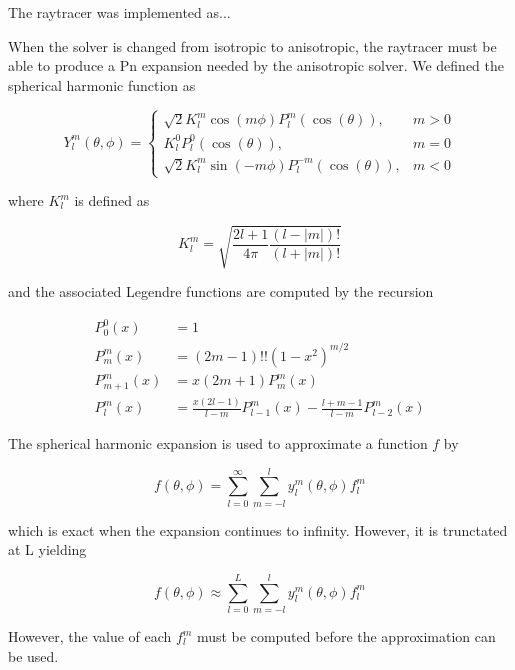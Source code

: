 \documentclass{article}
\numberwithin{equation}{subsection}
\begin{document}
The raytracer was implemented as...

When the solver is changed from isotropic to anisotropic, the raytracer must be able to produce a Pn expansion needed by the anisotropic solver. We defined the spherical harmonic function as

\begin{equation}
    Y_l^m(\theta, \phi)= 
\begin{cases}
\sqrt{2} K_l^m \cos(m \phi) P_l^m(\cos(\theta)),      & m > 0 \\
K_l^0 P_l^0(\cos(\theta)),              & m = 0  \\
\sqrt{2} K_l^m \sin(-m \phi) P_l^{-m}(\cos(\theta)),           & m < 0
\end{cases}
\end{equation}

where $K_l^m$ is defined as

\begin{equation}
K_l^m = \sqrt{\frac{2l+1}{4 \pi} \frac{(l-|m|)!}{(l+|m|)!}}
\end{equation}

and the associated Legendre functions are computed by the recursion

\begin{equation}
\begin{aligned}
P_0^0(x) &= 1 \\
P_m^m(x) &= (2m-1)!!(1-x^2)^{m/2} \\
P_{m+1}^m(x) &= x(2m+1)P_m^m(x) \\
P_l^m(x) &= \frac{x(2l-1)}{l-m} P_{l-1}^m (x) - \frac{l+m-1}{l-m} P_{l-2}^m (x)
\end{aligned}
\end{equation}

The spherical harmonic expansion is used to approximate a function $f$ by 

\begin{equation}
f(\theta, \phi) = \sum_{l=0}^\infty \sum_{m=-l}^l y_l^m(\theta, \phi) f_l^m
\end{equation}

which is exact when the expansion continues to infinity. However, it is trunctated at L yielding

\begin{equation}
f(\theta, \phi) \approx \sum_{l=0}^L \sum_{m=-l}^l y_l^m(\theta, \phi) f_l^m
\end{equation}

However, the value of each $f_l^m$ must be computed before the approximation can be used.
\end{document}

